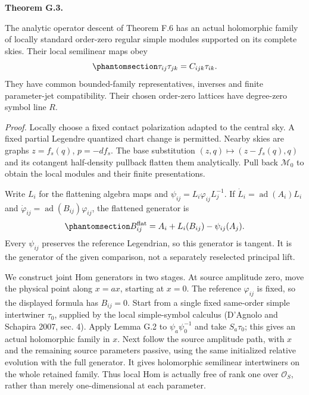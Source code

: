 \documentclass[
  english,
  11pt,
  reqno]{amsart}
\makeatletter
\newcommand{\pandocstatementheading}[1]{%
  \par\addpenalty{\@beginparpenalty}%
  \addvspace{.5\baselineskip plus .2\baselineskip minus .2\baselineskip}%
  {\normalfont\bfseries #1\par}%
  \nobreak\@afterindenttrue\@afterheading
}
\makeatother
\begin{document}
\pandocstatementheading{\protect{}\label{thm:gg-module-relative-descent}Theorem G.3.}

The analytic operator descent of Theorem F.6 has an actual holomorphic
family of locally standard order-zero regular simple modules supported
on its complete skies. Their local semilinear maps obey
\begin{equation}\protect\phantomsection\label{eq:gg-module-actual-triple}{
 \tau_{ij}\tau_{jk}=C_{ijk}\tau_{ik}.
}\end{equation} They have common bounded-family representatives,
inverses and finite parameter-jet compatibility. Their chosen order-zero
lattices have degree-zero symbol line \(R\).

\emph{Proof.} Locally choose a fixed contact polarization adapted to the
central sky. A fixed partial Legendre quantized chart change is
permitted. Nearby skies are graphs \(z=f_s(q)\), \(p=-df_s\). The base
substitution \((z,q)\mapsto(z-f_s(q),q)\) and its cotangent half-density
pullback flatten them analytically. Pull back \(\mathcal M_0\) to obtain
the local modules and their finite presentations.

Write \(L_i\) for the flattening algebra maps and
\(\psi_{ij}=L_i\varphi_{ij}L_j^{-1}\). If
\(\dot L_i=\operatorname{ad}(A_i)L_i\) and
\(\dot\varphi_{ij}=\operatorname{ad}(B_{ij})\varphi_{ij}\), the
flattened generator is
\begin{equation}\protect\phantomsection\label{eq:gg-module-actual-flat-generator}{
 B^{\rm flat}_{ij}
     =A_i+L_i(B_{ij})-\psi_{ij}(A_j).
}\end{equation} Every \(\psi_{ij}\) preserves the reference Legendrian,
so this generator is tangent. It is the generator of the given
comparison, not a separately reselected principal lift.

We construct joint Hom generators in two stages. At source amplitude
zero, move the physical point along \(x=ax\), starting at \(x=0\). The
reference \(\varphi_{ij}\) is fixed, so the displayed formula has
\(B_{ij}=0\). Start from a single fixed same-order simple intertwiner
\(\tau_0\), supplied by the local simple-symbol calculus (D'Agnolo and
Schapira 2007, sec. 4). Apply Lemma G.2 to \(\psi_a\psi_0^{-1}\) and
take \(S_a\tau_0\); this gives an actual holomorphic family in \(x\).
Next follow the source amplitude path, with \(x\) and the remaining
source parameters passive, using the same initialized relative evolution
with the full generator. It gives holomorphic semilinear intertwiners on
the whole retained family. Thus local Hom is actually free of rank one
over \(\mathcal O_S\), rather than merely one-dimensional at each
parameter.
\end{document}
